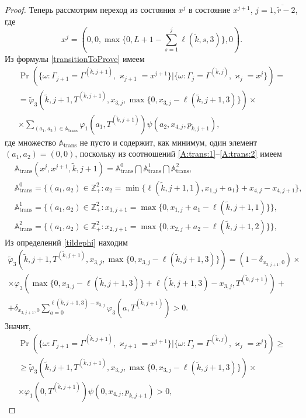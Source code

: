\documentclass[a4paper,12pt,russian]{extarticle}
\begin{document}
\begin{proof}
Теперь рассмотрим переход из состояния $x^j$ в состояние $x^{j+1}$, $j=\overline{1,\tilde{r}-2}$, где
\begin{equation*}
x^j = (0,0,\max{\{0,L+1-\sum_{s=1}^{j} \ell(\tilde{k},s,3)\}},0).
\end{equation*}
Из формулы \eqref{transitionToProve} имеем
\begin{multline*}
\Pr(\{\omega\colon \Gamma_{j+1}=\Gamma^{(\tilde{k},j+1)}, \varkappa_{j+1}=x^{j+1}\}|
\{\omega\colon \Gamma_{j}=\Gamma^{(\tilde{k},j)}, \varkappa_{j}=x^j\})=\\
=\widetilde{\varphi}_3(\tilde{k},j+1,T^{(\tilde{k},j+1)},x_{3,j},\max{\{0,x_{3,j} - \ell(\tilde{k},j+1,3)\}})\times \\
\times
\sum_{(a_1,a_2)\in {\mathbb A}_{\mathrm{trans}}}\varphi_1(a_1,T^{(\tilde{k},j+1)})  \psi(a_2,x_{4,j}, p_{\tilde{k},j+1}),
\end{multline*}
где множество ${\mathbb A}_{\mathrm{trans}}$ не пусто и содержит, как минимум, один элемент $(a_1,a_2)=(0,0)$, поскольку из соотношений \eqref{A:trans:1}--\eqref{A:trans:2} имеем
\begin{align*}
&{\mathbb A}_{\mathrm{trans}}(x^j,x^{j+1},\tilde{k},j+1) = {\mathbb A}_{\mathrm{trans}}^0 \bigcap {\mathbb A}_{\mathrm{trans}}^1\bigcap {\mathbb A}_{\mathrm{trans}}^2,\\
&{\mathbb A}_{\mathrm{trans}}^0 = \{(a_1,a_2) \in \mathbb{Z}_+^2 \colon a_2 = \min{\{\ell(\tilde{k},j+1,1), x_{1,j}+a_1}\} +x_{4,j}- x_{4,j+1}\},\\
&{\mathbb A}_{\mathrm{trans}}^1 = \{(a_1,a_2) \in \mathbb{Z}_+^2 \colon x_{1,j+1}=\max{\{0,x_{1,j}+a_1-\ell(\tilde{k},j+1,1)\}}\},\\
 &{\mathbb A}_{\mathrm{trans}}^2 = \{(a_1,a_2) \in \mathbb{Z}_+^2 \colon  x_{2,j+1} =\max{\{0,x_{2,j}+a_2-\ell(\tilde{k},j+1,2)\}}\},
\end{align*}
Из определений \eqref{tildephi} находим
\begin{multline*}
\widetilde{\varphi}_3(\tilde{k},j+1,T^{(\tilde{k},j+1)},x_{3,j},\max{\{0,x_{3,j} - \ell(\tilde{k},j+1,3)\}})= (1-\delta_{x_{3,j+1},0}) \times \\\times\varphi_3(\max{\{0,x_{3,j} - \ell(\tilde{k},j+1,3)\}} + \ell (\tilde{k},j+1,3) - x_{3,j},T^{(\tilde{k},j+1)} ) 
+\\+\delta_{x_{3,j+1},0} \sum_{a=0}^{\ell(\tilde{k},j+1,3)-x_{3,j}}\varphi_3 (a,T^{(\tilde{k},j+1)})>0.
\end{multline*}
Значит,
\begin{multline*}
\Pr(\{\omega\colon \Gamma_{j+1}=\Gamma^{(\tilde{k},j+1)}, \varkappa_{j+1}=x^{j+1}\}|\{\omega\colon 
\Gamma_{j}=\Gamma^{(\tilde{k},j)}, \varkappa_{j}=x^j\})\geqslant \\
\geqslant \widetilde{\varphi}_3(\tilde{k},j+1,T^{(\tilde{k},j+1)},x_{3,j},\max{\{0,x_{3,j} - \ell(\tilde{k},j+1,3)\}})
\times \\ \times
\varphi_1(0,T^{(\tilde{k},j+1)})  \psi(0,x_{4,j}, p_{\tilde{k},j+1}) > 0,
\end{multline*}


\end{proof}
\end{document}
